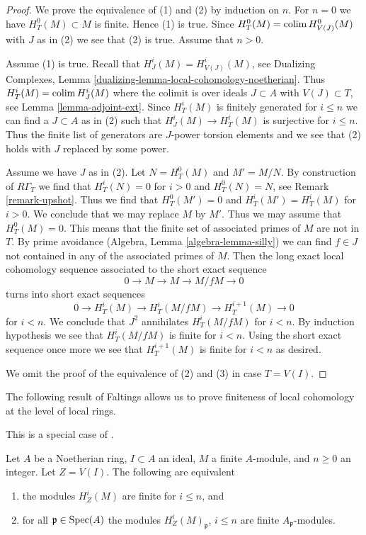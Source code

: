 \begin{proof}
We prove the equivalence of (1) and (2) by induction on $n$.
For $n = 0$ we have $H^0_T(M) \subset M$ is finite. Hence (1) is true.
Since $H^0_T(M) = \mathop{\mathrm{colim}}\nolimits H^0_{V(J)}(M)$ with $J$ as in (2) we see
that (2) is true. Assume that $n > 0$.

\medskip\noindent
Assume (1) is true. Recall that $H^i_J(M) = H^i_{V(J)}(M)$, see
Dualizing Complexes, Lemma \ref{dualizing-lemma-local-cohomology-noetherian}.
Thus $H^i_T(M) = \mathop{\mathrm{colim}}\nolimits H^i_J(M)$ where the colimit is over ideals
$J \subset A$ with $V(J) \subset T$, see
Lemma \ref{lemma-adjoint-ext}. Since $H^i_T(M)$ is finitely generated
for $i \leq n$ we can find a $J \subset A$ as in (2) such that
$H^i_J(M) \to H^i_T(M)$ is surjective for $i \leq n$.
Thus the finite list of generators are $J$-power torsion elements
and we see that (2) holds with $J$ replaced by some power.

\medskip\noindent
Assume we have $J$ as in (2). Let $N = H^0_T(M)$ and $M' = M/N$.
By construction of $R\Gamma_T$ we find that
$H^i_T(N) = 0$ for $i > 0$ and $H^0_T(N) = N$, see
Remark \ref{remark-upshot}. Thus we find that
$H^0_T(M') = 0$ and $H^i_T(M') = H^i_T(M)$ for $i > 0$.
We conclude that we may replace $M$ by $M'$.
Thus we may assume that $H^0_T(M) = 0$.
This means that the finite set of associated primes of $M$
are not in $T$. By prime avoidance (Algebra, Lemma \ref{algebra-lemma-silly})
we can find $f \in J$ not contained in any of the associated primes of $M$.
Then the long exact local cohomology sequence associated to the short
exact sequence
$$
0 \to M \to M \to M/fM \to 0
$$
turns into short exact sequences
$$
0 \to H^i_T(M) \to H^i_T(M/fM) \to H^{i + 1}_T(M) \to 0
$$
for $i < n$. We conclude that $J^2$ annihilates $H^i_T(M/fM)$
for $i < n$. By induction hypothesis we see that $H^i_T(M/fM)$
is finite for $i < n$. Using the short exact sequence once more
we see that $H^{i + 1}_T(M)$ is finite for $i < n$ as desired.

\medskip\noindent
We omit the proof of the equivalence of (2) and (3)
in case $T = V(I)$.
\end{proof}

\noindent
The following result of Faltings allows us to prove finiteness
of local cohomology at the level of local rings.

\begin{lemma}
\label{lemma-check-finiteness-local-cohomology-locally}
\begin{reference}
This is a special case of \cite[Satz 1]{Faltings-finiteness}.
\end{reference}
Let $A$ be a Noetherian ring, $I \subset A$ an ideal, $M$ a finite
$A$-module, and $n \geq 0$ an integer. Let $Z = V(I)$.
The following are equivalent
\begin{enumerate}
\item the modules $H^i_Z(M)$ are finite for $i \leq n$, and
\item for all $\mathfrak p \in \mathop{\mathrm{Spec}}(A)$ the modules
$H^i_Z(M)_\mathfrak p$, $i \leq n$ are finite $A_\mathfrak p$-modules.
\end{enumerate}
\end{lemma}

